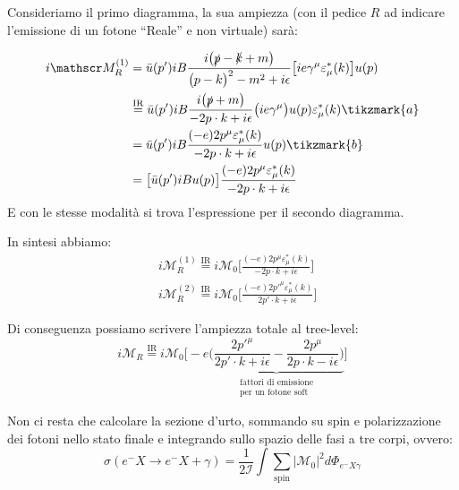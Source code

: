 \documentclass[../main.tex]{subfiles}
\begin{document}
Consideriamo il primo diagramma, la sua ampiezza (con il pedice $R$ ad indicare l'emissione di un fotone “Reale” e non virtuale) sarà:

\begin{align*}
    i\mathscr M_R^{(1)} &= \bar u(p')iB \frac{i\big(\slashed p - \slashed k + m\big)}{\big(p-k\big)^2 -m^2 + i\epsilon}\big[ie\gamma^\mu\varepsilon_\mu^\ast(k)\big]u(p) \\
    &\overset{\text{IR}}{=}\bar u(p')iB \frac{i\big(\slashed p + m\big)}{-2p\cdot k + i\epsilon}\big(ie\gamma^\mu\big)u(p)\varepsilon_\mu^\ast(k)\tikzmark{a}\\
    &=\bar u(p')iB \frac{(-e)2p^\mu\varepsilon_\mu^\ast(k)}{-2p\cdot k + i\epsilon}u(p) \tikzmark{b}\\
    &=\big[\bar u(p')iB u(p)\big]\frac{(-e)2p^\mu\varepsilon_\mu^\ast(k)}{-2p\cdot k + i\epsilon}
\end{align*}
E con le stesse modalità si trova l'espressione per il secondo diagramma. 

In sintesi abbiamo:
\begin{align*}
    &i\mathscr M_R^{(1)} \overset{\text{IR}}{=} i\mathscr M_0\bigg[\frac{(-e)2p^\mu\varepsilon_\mu^\ast(k)}{-2p\cdot k + i\epsilon}\bigg]\\
    &i\mathscr M_R^{(2)} \overset{\text{IR}}{=} i\mathscr M_0\bigg[\frac{(-e)2p'^\mu\varepsilon_\mu^\ast(k)}{2p'\cdot k + i\epsilon}\bigg]
\end{align*}

Di conseguenza possiamo scrivere l'ampiezza totale al tree-level:
\begin{equation}
    \boxed{
    i\mathscr M_R \overset{\text{IR}}{=} i\mathscr M_0\bigg[-e
    \underbrace{\bigg(\frac{2p'^\mu}{2p'\cdot k + i\epsilon} -\frac{2p^\mu}{2p\cdot k - i\epsilon}\bigg)}_{\substack{\text{fattori di emissione}\\\text{per un fotone soft}}}
    \bigg]}
    \label{eq:total_treelevel_amplitude_realemission}
\end{equation}

Non ci resta che calcolare la sezione d'urto, sommando su spin e polarizzazione dei fotoni nello stato finale e integrando sullo spazio delle fasi a tre corpi, ovvero:
\[
\sigma(e^-X\rightarrow e^-X+\gamma) = \frac{1}{2\mathscr I}\int\sum_{\text{spin}} |\mathscr M_0|^2d\Phi_{e^-X\gamma}
\]
\end{document}
